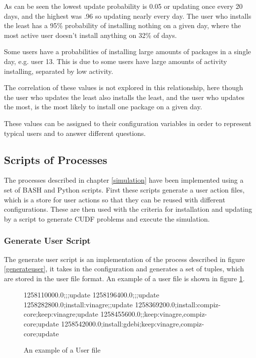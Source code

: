 As can be seen the lowest update probability is 0.05 or updating once every 20 days, and the highest was .96 so updating nearly every day.
The user who installs the least has a 95\% probability of installing nothing on a given day, where the most active user doesn't install anything on 32\% of days.

Some users have a probabilities of installing large amounts of packages in a single day, e.g. user 13.
This is due to some users have large amounts of activity installing, separated by low activity.

The correlation of these values is not explored in this relationship, here though the user who updates the least also installs the least,
and the user who updates the most, is the most likely to install one package on a given day.

These values can be assigned to their configuration variables in order to represent typical users and to answer different questions.

\subsection{Scripts of Processes}
The processes described in chapter \ref{simulation} have been implemented using a set of BASH and Python scripts.
First these scripts generate a user action files, which is a store for user actions so that they can be reused with different configurations.
These are then used with the criteria for installation and updating by a script to generate CUDF problems and execute the simulation.

\subsubsection{Generate User Script}
The generate user script is an implementation of the process described in figure \ref{generateuser}, 
it takes in the configuration and generates a set of tuples, which are stored in the user file format.
An example of a user file is shown in figure \ref{userfile}.

\begin{figure}[htp]
\begin{center}
1258110000.0;;;update
1258196400.0;;;update
1258282800.0;install:vinagre;;update
1258369200.0;install:compiz-core;keep:vinagre;update
1258455600.0;;keep:vinagre,compiz-core;update
1258542000.0;install:gdebi;keep:vinagre,compiz-core;update
  \caption[User File example]{An example of a User file}
  \label{userfile}
\end{center}
\end{figure}

